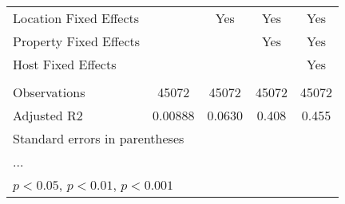 \begin{table}[htbp]
\begin{tabular}{l*{4}{c}}
\hline
Location Fixed Effects&                     &         Yes         &         Yes         &         Yes         \\
Property Fixed Effects&                     &                     &         Yes         &         Yes         \\
Host Fixed Effects  &                     &                     &                     &         Yes         \\
\hline \vspace{-1.25em}&                     &                     &                     &                     \\
Observations        &       45072         &       45072         &       45072         &       45072         \\
Adjusted R2         &     0.00888         &      0.0630         &       0.408         &       0.455         \\
\hline\hline
\multicolumn{5}{l}{\footnotesize Standard errors in parentheses}\\
\multicolumn{5}{l}{\footnotesize ...}\\
\multicolumn{5}{l}{\footnotesize \sym{*} \(p<0.05\), \sym{**} \(p<0.01\), \sym{***} \(p<0.001\)}\\
\end{tabular}
\end{table}
